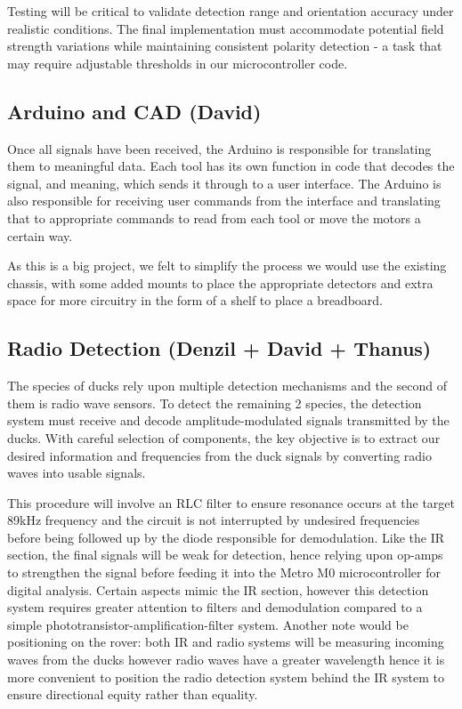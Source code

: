 Testing will be critical to validate detection range and orientation accuracy under realistic conditions. The final implementation must accommodate potential field strength variations while maintaining consistent polarity detection - a task that may require adjustable thresholds in our microcontroller code.

\subsection*{Arduino and CAD (David)}

Once all signals have been received, the Arduino is responsible for translating them to meaningful data. Each tool has its own function in code that decodes the signal, and meaning, which sends it through to a user interface. The Arduino is also responsible for receiving user commands from the interface and translating that to appropriate commands to read from each tool or move the motors a certain way.

As this is a big project, we felt to simplify the process we would use the existing chassis, with some added mounts to place the appropriate detectors and extra space for more circuitry in the form of a shelf to place a breadboard.

\subsection*{Radio Detection (Denzil + David + Thanus)}

The species of ducks rely upon multiple detection mechanisms and the second of them is radio wave sensors. To detect the remaining 2 species, the detection system must receive and decode amplitude-modulated signals transmitted by the ducks. With careful selection of components, the key objective is to extract our desired information and frequencies from the duck signals by converting radio waves into usable signals.

This procedure will involve an RLC filter to ensure resonance occurs at the target 89kHz frequency and the circuit is not interrupted by undesired frequencies before being followed up by the diode responsible for demodulation. Like the IR section, the final signals will be weak for detection, hence relying upon op-amps to strengthen the signal before feeding it into the Metro M0 microcontroller for digital analysis. Certain aspects mimic the IR section, however this detection system requires greater attention to filters and demodulation compared to a simple phototransistor-amplification-filter system. Another note would be positioning on the rover: both IR and radio systems will be measuring incoming waves from the ducks however radio waves have a greater wavelength hence it is more convenient to position the radio detection system behind the IR system to ensure directional equity rather than equality.

